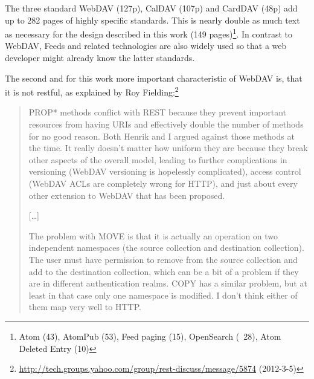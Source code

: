 \documentclass[12pt,a4paper]{scrartcl}		%
\newcommand{\citeurl}[2]{\url{#1} (#2)}
\begin{document}
The three standard WebDAV (127p), CalDAV (107p) and CardDAV (48p) add up to 282
pages of highly specific standards. This is nearly double as much text as
necessary for the design described in this work (149 pages)\footnote{Atom (43),
  AtomPub (53), Feed paging (15), OpenSearch (~28), Atom Deleted Entry (10)}. In
contrast to WebDAV, Feeds and related technologies are also widely used so that
a web developer might already know the latter standards.

The second and for this work more important characteristic of WebDAV is, that it
is not restful, as explained by Roy
Fielding:\footnote{\citeurl{http://tech.groups.yahoo.com/group/rest-discuss/message/5874}{2012-3-5}}

\begin{quotation}
PROP* methods conflict with REST because they prevent
important resources from having URIs and effectively double the
number of methods for no good reason. Both Henrik and I argued
against those methods at the time. It really doesn't matter
how uniform they are because they break other aspects of the
overall model, leading to further complications in versioning
(WebDAV versioning is hopelessly complicated), access control
(WebDAV ACLs are completely wrong for HTTP), and just about every
other extension to WebDAV that has been proposed.

[\ldots]

The problem with MOVE is that it is actually an operation on two
independent namespaces (the source collection and destination
collection). The user must have permission to remove from the
source collection and add to the destination collection, which
can be a bit of a problem if they are in different authentication
realms. COPY has a similar problem, but at least in that case
only one namespace is modified. I don't think either of them map
very well to HTTP.
\end{quotation}

\end{document}
